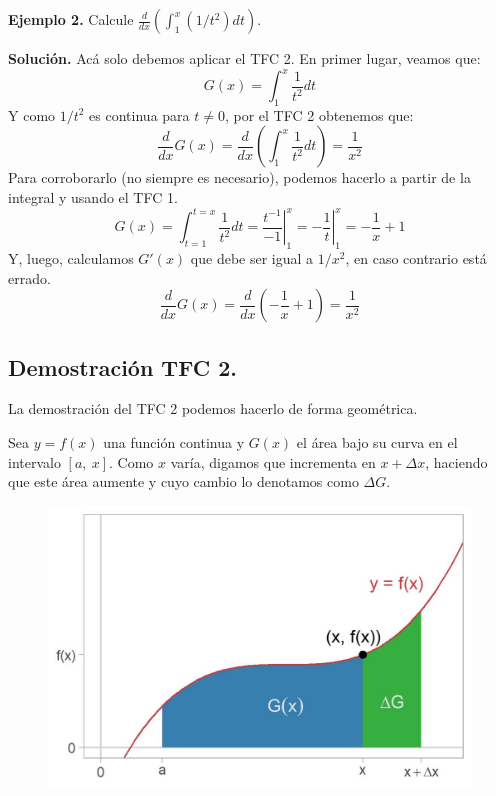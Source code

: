 \documentclass[12pt]{article}
\begin{document}
\textbf{Ejemplo 2.} \quad Calcule $\frac{d}{dx} \left(\int_{1}^{x} (1/t^{2})dt\right)$.

\textbf{Solución.} \quad Acá solo debemos aplicar el TFC 2. En primer lugar, veamos que:
\[
  G(x) = \int_{1}^{x} \frac{1}{t^{2}} dt
\]
Y como $1/t^{2}$ es continua para $t \neq 0$, por el TFC 2 obtenemos que:
\[
  \frac{d}{dx} G(x) = \frac{d}{dx} \left(\int_{1}^{x} \frac{1}{t^{2}} dt\right) = \frac{1}{x^{2}}
\]
Para corroborarlo (no siempre es necesario), podemos hacerlo a partir de la integral y usando el TFC 1.
\[
  G(x) = \int_{t = 1}^{t = x} \frac{1}{t^{2}} dt
       = \left.\frac{t^{-1}}{-1}\right|_{1}^{x}
       = \left. -\frac{1}{t}\right|_{1}^{x}
       = - \frac{1}{x} + 1
\]
Y, luego, calculamos $G'(x)$ que debe ser igual a $1/x^{2}$, en caso contrario está errado.
\[
  \frac{d}{dx} G(x) = \frac{d}{dx} \left(-\frac{1}{x} + 1\right) = \frac{1}{x^{2}}
\]

\subsection{Demostración TFC 2.}

La demostración del TFC 2 podemos hacerlo de forma geométrica.

Sea $y = f(x)$ una función continua y $G(x)$ el área bajo su curva en el intervalo $[a, \ x]$. Como $x$ varía, digamos que incrementa en $x + \Delta x$, haciendo que este área aumente y cuyo cambio lo denotamos como $\Delta G$.

\begin{figure}[hbt!]
\centering
\includegraphics[scale=0.7]{img/ftc2_proof.jpg}
\end{figure}
\end{document}
